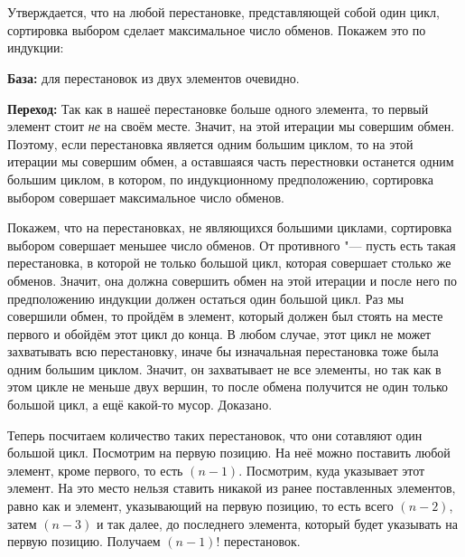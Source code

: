 \section{}
	Утверждается, что на любой перестановке, представляющей собой один цикл, сортировка выбором сделает максимальное число обменов. Покажем это по индукции:
	
	\textbf{База:} для перестановок из двух элементов очевидно.
	
	\textbf{Переход:} Так как в нашеё перестановке больше одного элемента, то первый элемент стоит \textit{не} на своём месте. Значит, на этой итерации мы совершим обмен. Поэтому, если перестановка является одним большим циклом, то на этой итерации мы совершим обмен, а оставшаяся часть перестновки останется одним большим циклом, в котором, по индукционному предположению, сортировка выбором совершает максимальное число обменов.
	
	Покажем, что на перестановках, не являющихся большими циклами, сортировка выбором совершает меньшее число обменов. От противного "--- пусть есть такая перестановка, в которой не только большой цикл, которая совершает столько же обменов. Значит, она должна совершить обмен на этой итерации и после него по предположению индукции должен остаться один большой цикл. Раз мы совершили обмен, то пройдём в элемент, который должен был стоять на месте первого и обойдём этот цикл до конца. В любом случае, этот цикл не может захватывать всю перестановку, иначе бы изначальная перестановка тоже была одним большим циклом. Значит, он захватывает не все элементы, но так как в этом цикле не меньше двух вершин, то после обмена получится не один только большой цикл, а ещё какой-то мусор. Доказано.
	
	Теперь посчитаем количество таких перестановок, что они сотавляют один большой цикл. Посмотрим на первую позицию. На неё можно поставить любой элемент, кроме первого, то есть $(n-1)$. Посмотрим, куда указывает этот элемент. На это место нельзя ставить никакой из ранее поставленных элементов, равно как и элемент, указывающий на первую позицию, то есть всего $(n-2)$, затем $(n-3)$ и так далее, до последнего элемента, который будет указывать на первую позицию. Получаем $(n-1)!$ перестановок.